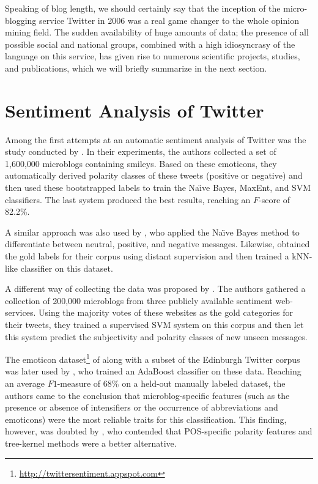 
Speaking of blog length, we should certainly say that the inception of
the micro-blogging service Twitter in 2006 was a real game changer to
the whole opinion mining field.  The sudden availability of huge
amounts of data; the presence of all possible social and national
groups, combined with a high idiosyncrasy of the language on this
service, has given rise to numerous scientific projects, studies, and
publications, which we will briefly summarize in the next section.

\section{Sentiment Analysis of Twitter}\label{snt:subsec:intro:saot}

Among the first attempts at an automatic sentiment analysis of Twitter
was the study conducted by \citet{Go:09}.  In their experiments, the
authors collected a set of 1,600,000 microblogs containing smileys.
Based on these emoticons, they automatically derived polarity classes
of these tweets (positive or negative) and then used these
bootstrapped labels to train the Na\"{\i}ve Bayes, MaxEnt, and SVM
classifiers.  The last system produced the best results, reaching an
$F$-score of 82.2\%.

A similar approach was also used by \citet{Pak:10}, who applied the
Na\"{\i}ve Bayes method to differentiate between neutral, positive,
and negative messages.  Likewise, \citet{Davidov:10} obtained the gold
labels for their corpus using distant supervision and then trained a
kNN-like classifier on this dataset.

A different way of collecting the data was proposed by
\citet{Barbosa:10}.  The authors gathered a collection of 200,000
microblogs from three publicly available sentiment web-services.
Using the majority votes of these websites as the gold categories for
their tweets, they trained a supervised SVM system on this corpus and
then let this system predict the subjectivity and polarity classes of
new unseen messages.

The emoticon
dataset\footnote{\url{http://twittersentiment.appspot.com}} of
\citet{Go:09} along with a subset of the Edinburgh Twitter corpus
\cite{Petrovic:10} was later used by \citet{Kouloumpis:11}, who
trained an AdaBoost classifier on these data.  Reaching an average
$F1$-measure of 68\% on a held-out manually labeled dataset, the
authors came to the conclusion that microblog-specific features (such
as the presence or absence of intensifiers or the occurrence of
abbreviations and emoticons) were the most reliable traits for this
classification.  This finding, however, was doubted by
\citet{Agarwal:11}, who contended that POS-specific polarity features
and tree-kernel methods were a better alternative.

